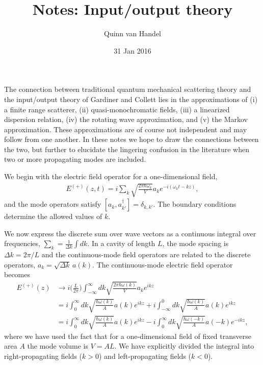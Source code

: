 \documentclass[pra]{revtex4}
\newcommand{\dg}{^\dagger}
\begin{document}
\title{Notes: Input/output theory}
\author{Quinn van Handel}
\date{31 Jan 2016}

\maketitle

The connection between traditional quantum mechanical scattering theory and the input/output theory of Gardiner and Collett lies in the approximations of (i) a finite range scatterer, (ii) quasi-monochromatic fields, (iii) a linearized dispersion relation, (iv) the rotating wave approximation, and (v) the Markov approximation. These approximations are of course not independent and may follow from one another. In these notes we hope to draw the connections between the two, but further to elucidate the lingering confusion in the literature when two or more propagating modes are included.

We begin with the electric field operator for a one-dimensional field, 
	\begin{align}
		E^{(+)}(z, t) = i\sum_{k} \sqrt{ \frac{ 2 \pi \hbar \omega_k}{V} } a_k e^{-i(\omega_k t - k z)},
	\end{align}
and the mode operators satisfy $[a_k, a\dg_{k'}] = \delta_{k,k'}$. The boundary conditions determine the allowed values of $k$. 
 
We now express the discrete sum over wave vectors as a continuous integral over frequencies, $\sum_k = \frac{1}{\Delta k } \int d k$. In a cavity of length $L$, the mode spacing is $\Delta k = 2 \pi/L$ and the continuous-mode field operators are related to the discrete operators, $a_k = \sqrt{\Delta k} \, a(k)$. The continuous-mode electric field operator becomes
 	\begin{align}
		E^{(+)}(z) & \rightarrow i\Big(\frac{L}{2 \pi} \Big) \int_{-\infty}^\infty dk \sqrt{ \frac{ 2 \pi \hbar \omega(k)}{V} } a_k e^{i k z} \\
		   		& =  i\int_0^\infty dk \sqrt{ \frac{ \hbar \omega(k)}{A} } a(k) e^{i k z} + i\int_{-\infty}^0 dk \sqrt{ \frac{ \hbar \omega(k)}{A} } a(k) e^{i k z}  \\
		  & =  i \int_0^\infty dk \sqrt{ \frac{ \hbar \omega(k)}{A} } a(k) e^{i k z} - i \int_{0}^\infty
		  dk \sqrt{ \frac{ \hbar \omega(-k)}{A} } a(-k) e^{-i k z} , \label{Eq::Efield1}
	\end{align}
where we have used the fact that for a one-dimensional field of fixed transverse area $A$ the mode volume is $V = A L$. 
We have explicitly divided the integral into right-propagating fields ($k>0$) and left-propagating fields ($k<0$).
 
\end{document}
